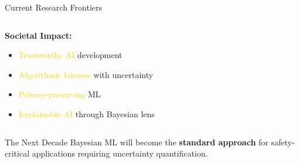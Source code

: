 \documentclass[aspectratio=169,11pt]{beamer}
\begin{document}
\begin{frame}{Current Research Frontiers}
\begin{columns}
\begin{column}{0.5\textwidth}
\vspace{0.3cm}
\textbf{Societal Impact:}
\begin{itemize}
\item \textcolor{gold}{Trustworthy AI} development
\item \textcolor{gold}{Algorithmic fairness} with uncertainty
\item \textcolor{gold}{Privacy-preserving} ML
\item \textcolor{gold}{Explainable AI} through Bayesian lens
\end{itemize}
\end{column}
\end{columns}

\begin{alertblock}{The Next Decade}
Bayesian ML will become the \textbf{standard approach} for safety-critical applications requiring uncertainty quantification.
\end{alertblock}
\end{frame}
\end{document}
